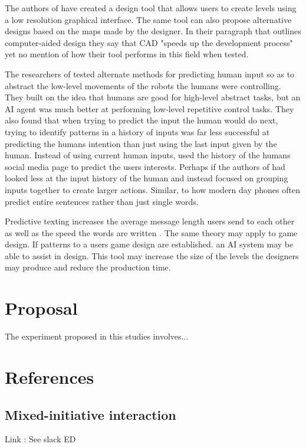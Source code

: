 \documentclass[journal]{IEEEtran}
\begin{document}
The authors of \cite{liapis2013sentient} have created a design tool that allows users to create levels using a low resolution graphical interface. The same tool can also propose alternative designs based on the maps made by the designer. In their paragraph that outlines computer-aided design they say that CAD "speeds up the development process" yet no mention of how their tool performs in this field when tested.

The researchers of \cite{chipalkatty2013less} tested alternate methods for predicting human input so as to abstract the low-level movements of the robots the humans were controlling. They built on the idea that humans are good for high-level abstract tasks, but an AI agent was much better at performing low-level repetitive control tasks. They also found that when trying to predict the input the human would do next, trying to identify patterns in a history of inputs was far less successful at predicting the humans intention than just using the last input given by the human. Instead of using current human inputs, \cite{bhatia2016targeted} used the history of the humans social media page to predict the users interests. Perhaps if the authors of \cite{chipalkatty2013less} had looked less at the input history of the human and instead focused on grouping inputs together to create larger actions. Similar,  to how modern day phones often predict entire sentences rather than just single words.

Predictive texting increases the average message length users send to each other \cite{ling2005length} as well as the speed the words are written \cite{dunlop2000predictive}. The same theory may apply to game design. If patterns to a users game design are established. an AI system may be able to assist in design. This tool may increase the size of the levels the designers may produce and reduce the production time. 

\section{Proposal}
The experiment proposed in this studies involves...

\section{References}
\subsection{Mixed-initiative interaction\cite{allen1999mixed}}
Link : See slack ED
\end{document}

